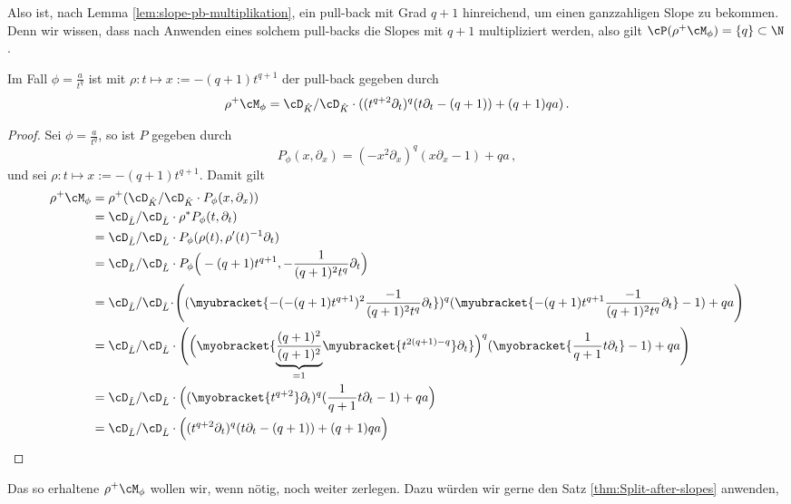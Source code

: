 Also ist, nach Lemma \ref{lem:slope-pb-multiplikation}, ein pull-back mit Grad
$q+1$ hinreichend, um einen ganzzahligen Slope zu bekommen. Denn wir wissen,
dass nach Anwenden eines solchem pull-backs die Slopes mit ${q+1}$
multipliziert werden, also gilt $\cP(\rho^+\cM_\phi)=\{q\}\subset\N$.
\begin{lem}
Im Fall $\phi=\frac{a}{t^{q}}$ ist mit $\rho:t\mapsto x:=-(q+1) t^{q+1}$ der
pull-back gegeben durch
\[
\rho^+\cM_\phi =\cD_{\hat K}/\cD_{\hat K} \cdot((t^{q+2}\partial_t)^{q}
    (t\partial_t-(q+1))+(q+1)qa) \,.
\]
\end{lem}
\begin{proof}
Sei $\phi=\frac{a}{t^{q}}$, so ist $P$ gegeben durch
\[
P_{\phi}(x,\partial_x) =(-x^2\partial_x)^{q} (x\partial_x-1)+qa \,,
\]
und sei $\rho:t\mapsto x:=-(q+1) t^{q+1}$. Damit gilt
\begin{align*}
\rho^+\cM_\phi &= \rho^+(\cD_{\hat K}/\cD_{\hat K}\cdot P_\phi(x,\partial_x))\\
  &=\cD_{\hat L}/\cD_{\hat L}\cdot\rho^*P_\phi(t,\partial_t)\\
  &=\cD_{\hat L}/\cD_{\hat L}\cdot P_\phi(\rho(t),\rho'(t)^{-1}\partial_t)\\
  &=\cD_{\hat L}/\cD_{\hat L}
    \cdot P_\phi\Big(-(q+1) t^{q+1},-\frac{1}{(q+1)^2t^q}\partial_t\Big)\\
  &=\cD_{\hat L}/\cD_{\hat L} \!\cdot\! \Bigg((\myubracket{
    -(-(q+1) t^{q+1})^2\frac{-1}{(q+1)^2t^{q}}\partial_t})^{q}
    (\myubracket{-(q+1) t^{q+1}\frac{-1}{(q+1)^2t^{q}}\partial_t}-1)
    +qa\Bigg)\\
  &=\cD_{\hat L}/\cD_{\hat L}
    \cdot\Bigg(\Big(\myobracket{
      \underset{=1}{\underbrace{\frac{(q+1)^2}{(q+1)^2}}}
      \myubracket{t^{2(q+1)-q}}\partial_t}\Big)^{q}
    (\myobracket{\frac{1}{q+1}t\partial_t}-1)+qa\Bigg)\\
  &=\cD_{\hat L}/\cD_{\hat L}
    \cdot\Big((\myobracket{t^{q+2}}\partial_t)^{q}
    (\frac{1}{q+1}t\partial_t-1)+qa\Big)\\
  &=\cD_{\hat L}/\cD_{\hat L}
    \cdot\Big((t^{q+2}\partial_t)^{q}
    (t\partial_t-(q+1))+(q+1)qa\Big)
\end{align*}
\end{proof}
\begin{comment}
\begin{cor}
Ordnung vom pull-back ist $0$
\end{cor}
\end{comment}
Das so erhaltene $\rho^+\cM_\phi$ wollen wir, wenn nötig, noch weiter
zerlegen. Dazu würden wir gerne den Satz \ref{thm:Split-after-slopes} anwenden,
